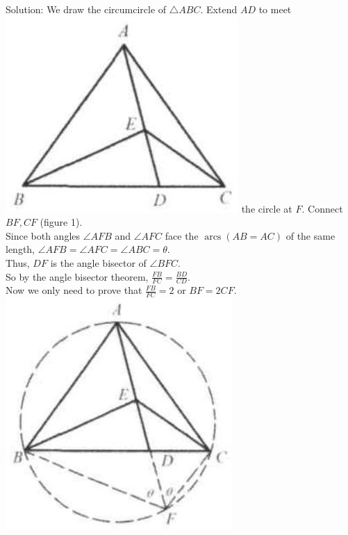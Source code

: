 \documentclass[10pt]{article}
\begin{document}
Solution:
We draw the circumcircle of \(\triangle A B C\). Extend \(A D\) to meet\\
\includegraphics[max width=\textwidth]{2025_04_17_97bc1f7e44d93c271a88g-202(2)} the circle at \(F\). Connect \(B F, C F\) (figure 1).\\
Since both angles \(\angle A F B\) and \(\angle A F C\) face the \(\operatorname{arcs}(A B=A C)\) of the same length, \(\angle A F B=\angle A F C=\angle A B C=\theta\).\\
Thus, \(D F\) is the angle bisector of \(\angle B F C\).\\
So by the angle bisector theorem, \(\frac{F B}{F C}=\frac{B D}{C D}\).\\
Now we only need to prove that \(\frac{F B}{F C}=2\) or \(B F=2 C F\).\\
\includegraphics[max width=\textwidth, center]{2025_04_17_97bc1f7e44d93c271a88g-202}
\end{document}
